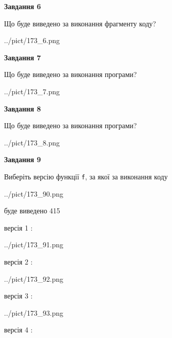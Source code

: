 \documentclass[12pt, ukrainian]{article}
\def\code#1{\Verb!#1!}
\begin{document}
{\begin {large}
{\begin {center}\textbf{Завдання 6}\end {center}}

Що буде виведено за виконання фрагменту коду?\par
\begin{center}
	{../pict/173_6.png}
\end{center}
\newpage

{\begin {center}\textbf{Завдання 7}\end {center}}

Що буде виведено за виконання програми?\par
\begin{center}
	{../pict/173_7.png}
\end{center}
\newpage

{\begin {center}\textbf{Завдання 8}\end {center}}

Що буде виведено за виконання програми?\par
\begin{center}
	{../pict/173_8.png}
\end{center}
\newpage

{\begin {center}\textbf{Завдання 9}\end {center}}

Виберіть версію функції \code{f}, за якої за виконання коду
\begin{center}
	{../pict/173_90.png}
\end{center}
буде виведено 415

\vspace{5mm}
версія 1 :

\begin{center}
	{../pict/173_91.png}
\end{center}
версія 2 :

\begin{center}
	{../pict/173_92.png}
\end{center}
версія 3 :

\begin{center}
	{../pict/173_93.png}
\end{center}
версія 4 :


\end{large}}
\end{document}
